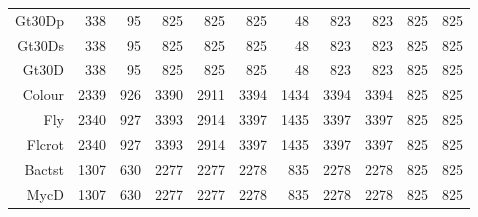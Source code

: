 \begin{table}[p]
\begin{tabular}{rrrrrrrrrrr}
  Gt30Dp & 338 &  95 & 825 & 825 & 825 &  48 & 823 & 823 & 825 & 825 \\ 
  Gt30Ds & 338 &  95 & 825 & 825 & 825 &  48 & 823 & 823 & 825 & 825 \\ 
  Gt30D & 338 &  95 & 825 & 825 & 825 &  48 & 823 & 823 & 825 & 825 \\ 
  Colour & 2339 & 926 & 3390 & 2911 & 3394 & 1434 & 3394 & 3394 & 825 & 825 \\ 
  Fly & 2340 & 927 & 3393 & 2914 & 3397 & 1435 & 3397 & 3397 & 825 & 825 \\ 
  Flcrot & 2340 & 927 & 3393 & 2914 & 3397 & 1435 & 3397 & 3397 & 825 & 825 \\ 
  Bactst & 1307 & 630 & 2277 & 2277 & 2278 & 835 & 2278 & 2278 & 825 & 825 \\ 
  MycD & 1307 & 630 & 2277 & 2277 & 2278 & 835 & 2278 & 2278 & 825 & 825 \\ 
   \hline
\end{tabular}
\normalsize
\end{table}
